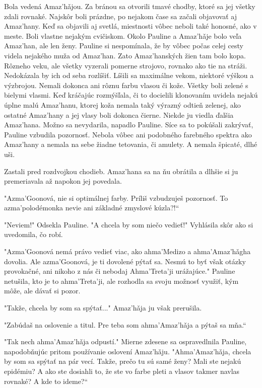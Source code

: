 \documentclass{book}
\begin{document}
Bola vedená Amaz'ha\v{}jou. Za bránou sa otvorili tmavé chodby, ktoré sa jej všetky zdali rovnaké. Najskôr boli prázdne, po nejakom čase sa začali objavovať aj Amaz'hany. Keď sa objavili aj svetlá, miestnosti vôbec neboli také honosné, ako v meste. Boli vlastne nejakým cvičiskom. Okolo Pauline a Amaz'ha\v{}je bolo veľa Amaz'han, ale len ženy. Pauline si nespomínala, že by vôbec počas celej cesty videla nejakého muža od Amaz'han. Zato Amaz'hanských žien tam bolo kopa. Rôzneho veku, ale všetky vyzerali pomerne strojovo, rovnako ako tie na stráži. Nedokázala by ich od seba rozlíšiť. Líšili sa maximálne vekom, niektoré výškou a výzbrojou. Nemali dokonca ani rôznu farbu vlasou či kože. Všetky boli zelené s bielymi vlasmi. Keď kráčajúc rozmýšľala, či to docielili klonovaním uvidela nejakú úplne malú Amaz'hanu, ktorej koža nemala taký výrazný odtieň zelenej, ako ostatné Amaz'hany a jej vlasy boli dokonca čierne. Niekde ju viedla ďalšia Amaz'hana. Možno sa nevydarila, napadlo Pauline. Síce sa to pokúšali zakrývať, Pauline vzbudila pozornosť. Nebola vôbec ani podobného farebného spektra ako Amaz'hany a nemala na sebe žiadne tetovania, či amulety. A nemala špicaté, dlhé uši.

Zastali pred rozdvojkou chodieb. Amaz'hana sa na ňu obrátila a dlhšie si ju premeriavala až napokon jej povedala.

"$ $Azma'Goonová, nie si optimálnej farby. Príliš vzbudzuješ pozornosť. To azma'polodémonka nevie ani základné zmyslové kúzla?!“

"$ $Neviem!"$ $ Odsekla Pauline. "$ $A chcela by som niečo vedieť!"$ $ Vyhlásila skôr ako si uvedomila, čo robí.

"$ $Azma'Goonová nemá právo vedieť viac, ako ahma'Medizo a ahma'Amaz'ha\v{}gha dovolia. Ale azma'Goonová, je ti dovolené pýtať sa. Nesmú to byť však otázky provokačné, ani nikoho z nás či nebodaj Ahma'Treta'ji urážajúce."$ $ Pauline netušila, kto je to ahma'Treta'ji, ale rozhodla sa svoju možnosť využiť, kým môže, ale dávať si pozor.

"$ $Takže, chcela by som sa spýtať..."$ $ Amaz'ha\v{}ja ju však prerušila.

"$ $Zabúdaš na oslovenie a titul. Pre teba som ahma'Amaz'ha\v{}ja a pýtaš sa mňa.“

"$ $Tak nech ahma'Amaz'ha\v{}ja odpustí."$ $ Mierne zdesene sa ospravedlnila Pauline, napodobňujúc pritom používanie oslovení Amaz'ha\v{}ju. "$ $Ahma'Amaz'ha\v{}ja, chcela by som sa spýtať na pár vecí. Takže, prečo tu sú samé ženy? Mali ste nejakú epidémiu? A ako ste dosiahli to, že ste vo farbe pleti a vlasov takmer navlas rovnaké? A kde to ideme?“
\end{document}
